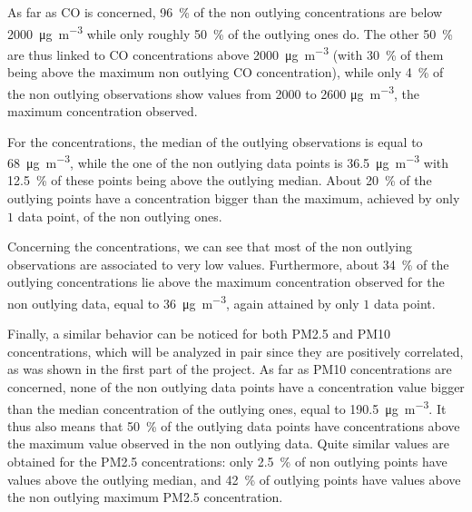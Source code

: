 \documentclass[a4paper, 12pt]{article}
\begin{document}
    As far as CO is concerned, \SI{96}{\percent} of the non outlying concentrations are below \SI{2000}{\micro\gram\per\meter\cubed} while only roughly \SI{50}{\percent} of the outlying ones do. The other \SI{50}{\percent} are thus linked to CO concentrations above \SI{2000}{\micro\gram\per\meter\cubed} (with \SI{30}{\percent} of them being above the maximum non outlying CO concentration), while only \SI{4}{\percent} of the non outlying observations show values from \num{2000} to \num{2600} \si{\micro\gram\per\meter\cubed}, the maximum concentration observed. 
    
    For the  concentrations, the median of the outlying observations is equal to \SI{68}{\micro\gram\per\meter\cubed}, while the one of the non outlying data points is \SI{36.5}{\micro\gram\per\meter\cubed} with \SI{12.5}{\percent} of these points being above the outlying median. About \SI{20}{\percent} of the outlying points have a concentration bigger than the maximum, achieved by only $1$ data point, of the non outlying ones.
    
    Concerning the  concentrations, we can see that most of the non outlying observations are associated to very low values. Furthermore, about \SI{34}{\percent} of the outlying concentrations lie above the maximum concentration observed for the non outlying data, equal to \SI{36}{\micro\gram\per\meter\cubed}, again attained by only $1$ data point.
    
    Finally, a similar behavior can be noticed for both PM2.5 and PM10 concentrations, which will be analyzed in pair since they are positively correlated, as was shown in the first part of the project. As far as PM10 concentrations are concerned, none of the non outlying data points have a concentration value bigger than the median concentration of the outlying ones, equal to \SI{190.5}{\micro\gram\per\meter\cubed}. It thus also means that \SI{50}{\percent} of the outlying data points have concentrations above the maximum value observed in the non outlying data. Quite similar values are obtained for the PM2.5 concentrations: only \SI{2.5}{\percent} of non outlying points have values above the outlying median, and \SI{42}{\percent} of outlying points have values above the non outlying maximum PM2.5 concentration.
    
    \newpage
    
\end{document}
